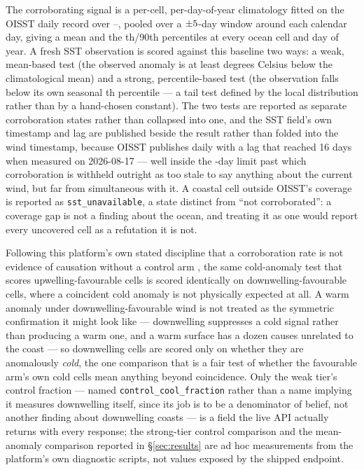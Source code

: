  The corroborating
signal is a per-cell, per-day-of-year climatology fitted on the OISST daily
record over \OisstBaselineStart{}--\OisstBaselineEnd{}, pooled over a
$\pm5{}$-day window around each calendar day, giving a mean and
the \ClimPercentile{}th/90th percentiles at every ocean cell and day of year.
A fresh SST observation is scored against this baseline two ways: a weak,
mean-based test (the observed anomaly is at least \CoolAnomalyThreshold{}
degrees Celsius below the climatological mean) and a strong, percentile-based
test (the observation falls below its own seasonal \ClimPercentile{}th
percentile --- a tail test defined by the local distribution rather than by a
hand-chosen constant). The two tests are reported as separate corroboration
states rather than collapsed into one, and the SST field's own timestamp and
lag are published beside the result rather than folded into the wind
timestamp, because OISST publishes daily with a lag that reached 16 days
when measured on 2026-08-17 --- well inside the \MaxSstLagDays{}-day limit
past which corroboration is withheld outright as too stale to say anything
about the current wind, but far from simultaneous with it. A coastal cell
outside OISST's coverage is reported as \texttt{sst\_unavailable}, a state
distinct from ``not corroborated'': a coverage gap is not a finding about
the ocean, and treating it as one would report every uncovered cell as a
refutation it is not.

 Following this platform's own stated discipline that
a corroboration rate is not evidence of causation without a control arm
\citep{silentfailures2026}, the same cold-anomaly test that scores
upwelling-favourable cells is scored identically on downwelling-favourable
cells, where a coincident cold anomaly is not physically expected at all. A
warm anomaly under downwelling-favourable wind is not treated as the
symmetric confirmation it might look like --- downwelling suppresses a cold
signal rather than producing a warm one, and a warm surface has a dozen
causes unrelated to the coast --- so downwelling cells are scored only on
whether they are anomalously \emph{cold}, the one comparison that is a fair
test of whether the favourable arm's own cold cells mean anything beyond
coincidence. Only the weak tier's control fraction --- named
\texttt{control\_cool\_fraction} rather than a name implying it measures
downwelling itself, since its job is to be a denominator of belief, not
another finding about downwelling coasts --- is a field the live API
actually returns with every response; the strong-tier control comparison and
the mean-anomaly comparison reported in \S\ref{sec:results} are ad hoc
measurements from the platform's own diagnostic scripts, not values exposed
by the shipped endpoint.

